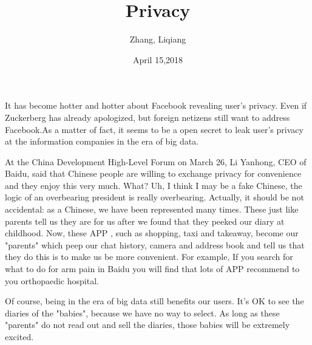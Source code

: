 \documentclass{article}
\author{Zhang, Liqiang}
\date{April 15,2018}
\title{Privacy}
\begin{document}
\maketitle

It has become hotter and hotter about Facebook revealing user's privacy. Even if Zuckerberg has already apologized, but foreign netizens still want to address Facebook.As a matter of fact, it seems to be a open secret to leak user's privacy at the information companies in the era of big data.

At the China Development High-Level Forum on March 26, Li Yanhong, CEO of Baidu, said that Chinese people are willing to exchange privacy for convenience and they enjoy this very much. What? Uh, I think I may be a fake Chinese, the logic of an overbearing president is really overbearing. Actually, it should be not accidental: as a Chinese, we have been represented many times. These just like parents tell us they are for us after we found that they peeked our diary at childhood. Now, these APP , such as shopping, taxi and takeaway, become our "parents" which peep our chat history, camera and address book and tell us that they do this is to make us be more convenient. For example, If you search for what to do for arm pain in Baidu you will find that lots of APP recommend to you orthopaedic hospital.

Of course, being in the era of big data still benefits our users. It's OK to see the diaries of the "babies", because we have no way to select. As long as these "parents" do not read out and sell the diaries, those babies will be extremely excited.
\end{document}
